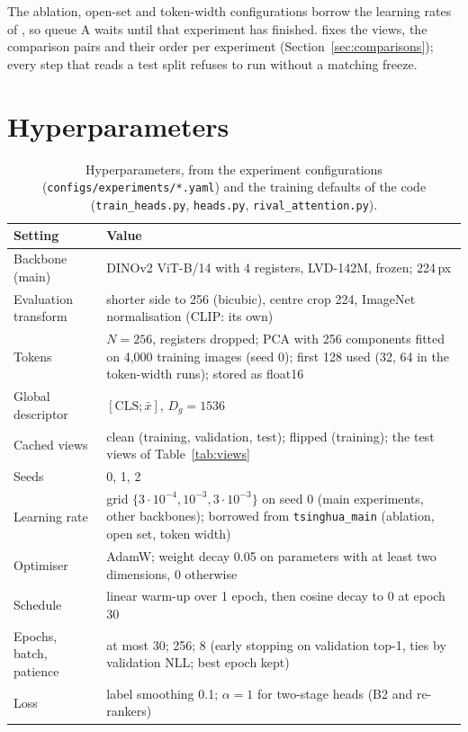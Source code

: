 \documentclass[11pt,a4paper]{article}
\theoremstyle{plain}
\newcommand{\fn}[1]{\texttt{\detokenize{#1}}}
\begin{document}
\noindent The ablation, open-set and token-width configurations borrow the learning rates of \fn{tsinghua_main}, so
queue A waits until that experiment has finished. \fn{final_all.sh} fixes the views, the comparison pairs and their
order per experiment (Section~\ref{sec:comparisons}); every step that reads a test split refuses to run without a
matching freeze.

\section{Hyperparameters}\label{app:hyper}
\begin{table}[!htbp]
\centering
\caption{Hyperparameters, from the experiment configurations (\texttt{configs/experiments/*.yaml}) and the training
defaults of the code (\texttt{train\_heads.py}, \texttt{heads.py}, \texttt{rival\_attention.py}).}
\label{tab:hyper}
\small
\begin{tabularx}{\textwidth}{@{}L{3.6cm}Y@{}}
\toprule
Setting & Value\\
\midrule
Backbone (main) & DINOv2 ViT-B/14 with 4 registers, LVD-142M, frozen; 224\,px\\
Evaluation transform & shorter side to 256 (bicubic), centre crop 224, ImageNet normalisation (CLIP: its own)\\
Tokens & $N=256$, registers dropped; PCA with 256 components fitted on 4,000 training images (seed 0); first 128
used (32, 64 in the token-width runs); stored as float16\\
Global descriptor & $[\mathrm{CLS};\bar x]$, $D_g=1536$\\
Cached views & clean (training, validation, test); flipped (training); the test views of Table~\ref{tab:views}\\
Seeds & 0, 1, 2\\
Learning rate & grid $\{3\cdot10^{-4},10^{-3},3\cdot10^{-3}\}$ on seed 0 (main experiments, other backbones);
borrowed from \texttt{tsinghua\_main} (ablation, open set, token width)\\
Optimiser & AdamW; weight decay 0.05 on parameters with at least two dimensions, 0 otherwise\\
Schedule & linear warm-up over 1 epoch, then cosine decay to 0 at epoch 30\\
Epochs, batch, patience & at most 30; 256; 8 (early stopping on validation top-1, ties by validation NLL; best epoch
kept)\\
Loss & label smoothing 0.1; $\alpha=1$ for two-stage heads (B2 and re-rankers)\\

\end{tabularx}
\end{table}
\end{document}

